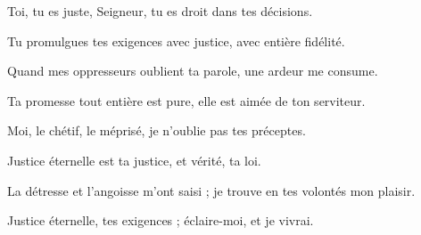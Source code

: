 \item Toi, tu es juste, Seigneur, tu es droit dans tes décisions.

\item Tu promulgues tes exigences avec justice, avec entière fidélité.

\item Quand mes oppresseurs oublient ta parole, une ardeur me consume.

\item Ta promesse tout entière est pure, elle est aimée de ton serviteur.

\item Moi, le chétif, le méprisé, je n'oublie pas tes préceptes.

\item Justice éternelle est ta justice, et vérité, ta loi.

\item La détresse et l'angoisse m'ont saisi ; je trouve en tes volontés mon plaisir.

\item Justice éternelle, tes exigences ; éclaire-moi, et je vivrai.
